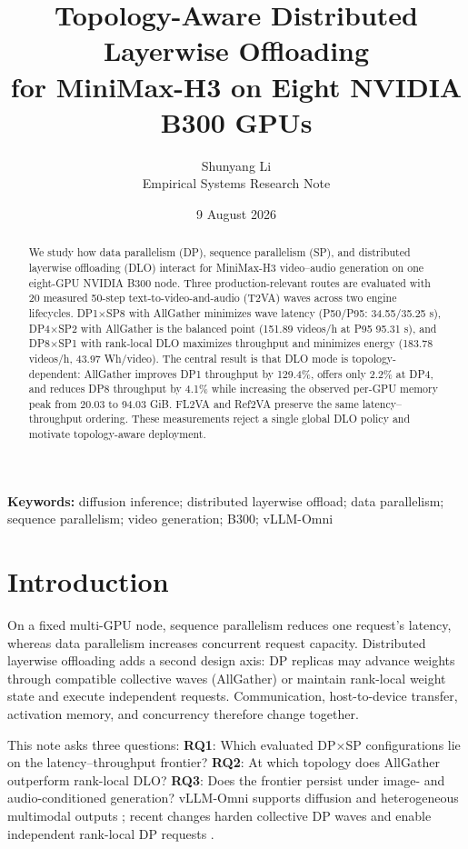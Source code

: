 \documentclass[10pt]{article}
\title{\textbf{Topology-Aware Distributed Layerwise Offloading\\
for MiniMax-H3 on Eight NVIDIA B300 GPUs}}
\author{Shunyang Li\\\small Empirical Systems Research Note}
\date{9 August 2026}
\begin{document}
\maketitle

\begin{abstract}
We study how data parallelism (DP), sequence parallelism (SP), and distributed
layerwise offloading (DLO) interact for MiniMax-H3 video--audio generation on
one eight-GPU NVIDIA B300 node.  Three production-relevant routes are evaluated
with 20 measured 50-step text-to-video-and-audio (T2VA) waves across two engine
lifecycles.  DP1$\times$SP8 with AllGather minimizes wave latency
(P50/P95: 34.55/35.25 s), DP4$\times$SP2 with AllGather is the balanced point
(151.89 videos/h at P95 95.31 s), and DP8$\times$SP1 with rank-local DLO
maximizes throughput and minimizes energy (183.78 videos/h, 43.97 Wh/video).
The central result is that DLO mode is topology-dependent: AllGather improves
DP1 throughput by 129.4\%, offers only 2.2\% at DP4, and reduces DP8
throughput by 4.1\% while increasing the observed per-GPU memory peak from
20.03 to 94.03 GiB.  FL2VA and Ref2VA preserve the same
latency--throughput ordering.  These measurements reject a single global DLO
policy and motivate topology-aware deployment.
\end{abstract}

\textbf{Keywords:} diffusion inference; distributed layerwise offload; data
parallelism; sequence parallelism; video generation; B300; vLLM-Omni

\section{Introduction}

On a fixed multi-GPU node, sequence parallelism reduces one request's latency,
whereas data parallelism increases concurrent request capacity.  Distributed
layerwise offloading adds a second design axis: DP replicas may advance weights
through compatible collective waves (AllGather) or maintain rank-local weight
state and execute independent requests.  Communication, host-to-device
transfer, activation memory, and concurrency therefore change together.

This note asks three questions:
\textbf{RQ1}: Which evaluated DP$\times$SP configurations lie on the
latency--throughput frontier?
\textbf{RQ2}: At which topology does AllGather outperform rank-local DLO?
\textbf{RQ3}: Does the frontier persist under image- and audio-conditioned
generation?
vLLM-Omni supports diffusion and heterogeneous multimodal outputs
\cite{vllmomni}; recent changes harden collective DP waves \cite{pr5864} and
enable independent rank-local DP requests \cite{pr5911}.
\end{document}
